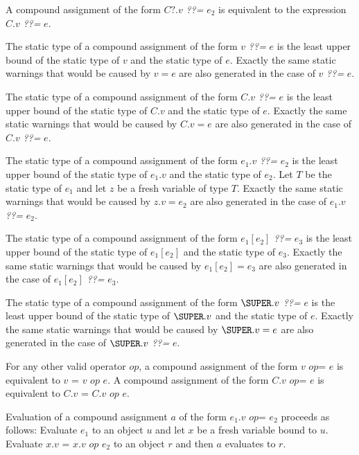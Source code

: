 \documentclass{article}
\newcommand{\code}[1]{{\sf #1}}
\begin{document}

\LMHash{}
A compound assignment of the form $C?.v$  {\em ??=} $e_2$ is equivalent to the expression $C.v$ {\em ??=} $e$.

\LMHash{}
The static type of a compound assignment of the form $v$ {\em ??=} $e$ is the least upper bound of the static type of $v$ and the static type of $e$.  Exactly the same static warnings that would be caused by $v = e$ are also generated in the case of $v$ {\em ??=} $e$.

\LMHash{}
The static type of a compound assignment of the form  $C.v$ {\em ??=} $e$  is the least upper bound of the static type of $C.v$ and the static type of $e$.  Exactly the same static warnings that would be caused by $C.v = e$ are also generated in the case of $C.v$ {\em ??=} $e$.

\LMHash{}
The static type of a compound assignment of the form $e_1.v$  {\em ??=} $e_2$ is the least upper bound of the static type of $e_1.v$ and the static type of $e_2$. Let $T$ be the static type of $e_1$ and let $z$ be a fresh variable of type $T$. Exactly the same static warnings that would be caused by $z.v = e_2$ are also generated in the case of $e_1.v$  {\em ??=} $e_2$.

\LMHash{}
The static type of a compound assignment of the form $e_1[e_2]$  {\em ??=} $e_3$  is the least upper bound of the static type of $e_1[e_2]$ and the static type of $e_3$. Exactly the same static warnings that would be caused by $e_1[e_2] = e_3$ are also generated in the case of $e_1[e_2]$  {\em ??=} $e_3$.

\LMHash{}
The static type of a compound assignment of the form $\SUPER.v$  {\em ??=} $e$  is the least upper bound of the static type of $\SUPER.v$ and the static type of $e$. Exactly the same static warnings that would be caused by $\SUPER.v = e$ are also generated in the case of $\SUPER.v$  {\em ??=} $e$.

\LMHash{}
For any other valid operator $op$, a compound assignment of the form \code{$v$ $op$= $e$} is equivalent to \code{$v$ = $v$ $op$ $e$}. A compound assignment of the form \code{$C$.$v$ $op$= $e$} is equivalent to \code{$C$.$v$ = $C$.$v$ $op$ $e$}.

\LMHash{}
Evaluation of a compound assignment $a$ of the form \code{$e_1$.$v$ $op$= $e_2$} proceeds as follows:
Evaluate $e_1$ to an object $u$ and let $x$ be a fresh variable bound to $u$.
Evaluate \code{$x$.$v$ = $x$.$v$ $op$ $e_2$} to an object $r$
and then $a$ evaluates to $r$.
\end{document}
